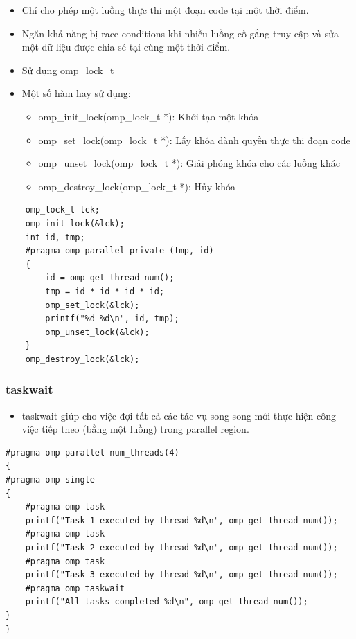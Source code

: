 \documentclass[14pt, a4paper]{article}
\numberwithin{equation}{section}
\numberwithin{figure}{section}
\numberwithin{dl}{section}
\numberwithin{md}{section}
\numberwithin{bd}{section}
\numberwithin{dn}{section}
\numberwithin{hq}{section}
\begin{document}
\begin{itemize}
    \item Chỉ cho phép một luồng thực thi một đoạn code tại một thời điểm.
    \item Ngăn khả năng bị race conditions khi nhiều luồng cố gắng truy cập và sửa một dữ liệu được chia sẻ tại cùng một thời điểm.
    \item Sử dụng omp\_lock\_t
    \item Một số hàm hay sử dụng:
    \begin{itemize}
        \item omp\_init\_lock(omp\_lock\_t *): Khởi tạo một khóa
        \item omp\_set\_lock(omp\_lock\_t *): Lấy khóa dành quyền thực thi đoạn code
        \item omp\_unset\_lock(omp\_lock\_t *): Giải phóng khóa cho các luồng khác
        \item omp\_destroy\_lock(omp\_lock\_t *): Hủy khóa
    \end{itemize}
\end{itemize}


\begin{verbatim}
    omp_lock_t lck;
    omp_init_lock(&lck);
    int id, tmp;
    #pragma omp parallel private (tmp, id)
    {
        id = omp_get_thread_num();
        tmp = id * id * id * id;
        omp_set_lock(&lck);
        printf("%d %d\n", id, tmp);
        omp_unset_lock(&lck);
    }
    omp_destroy_lock(&lck); 
\end{verbatim}

\subsubsection{taskwait}

\begin{itemize}
    \item taskwait giúp cho việc đợi tất cả các tác vụ song song mới thực hiện công việc tiếp theo (bằng một luồng) trong parallel region.
\end{itemize}

\begin{verbatim}
#pragma omp parallel num_threads(4)
{
#pragma omp single
{
    #pragma omp task
    printf("Task 1 executed by thread %d\n", omp_get_thread_num());
    #pragma omp task
    printf("Task 2 executed by thread %d\n", omp_get_thread_num());
    #pragma omp task
    printf("Task 3 executed by thread %d\n", omp_get_thread_num());
    #pragma omp taskwait
    printf("All tasks completed %d\n", omp_get_thread_num());
}
}
\end{verbatim}
\end{document}
